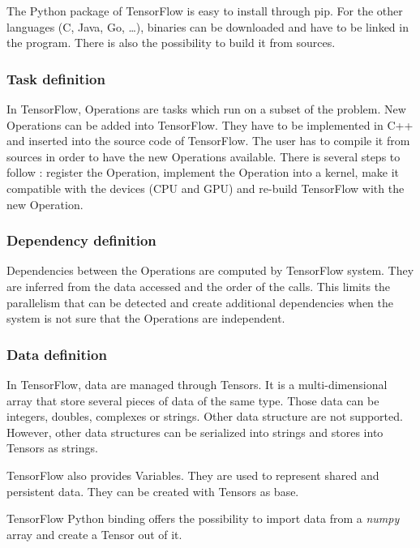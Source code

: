 The Python package of TensorFlow is easy to install through pip.
For the other languages (C, Java, Go, \dots), binaries can be downloaded and have to be linked in the program.
There is also the possibility to build it from sources.

\begin{figure}[h]

\end{figure}

\subsubsection{Task definition}
In TensorFlow, Operations are tasks which run on a subset of the problem.
New Operations can be added into TensorFlow.
They have to be implemented in C++ and inserted into the source code of TensorFlow.
The user has to compile it from sources in order to have the new Operations available.
There is several steps to follow : register the Operation, implement the Operation into a kernel, make it compatible with the devices (CPU and GPU) and re-build TensorFlow with the new Operation.


\subsubsection{Dependency definition}
Dependencies between the Operations are computed by TensorFlow system.
They are inferred from the data accessed and the order of the calls.
This limits the parallelism that can be detected and create additional dependencies when the system is not sure that the Operations are independent.

\subsubsection{Data definition}
In TensorFlow, data are managed through Tensors.
It is a multi-dimensional array that store several pieces of data of the same type.
Those data can be integers, doubles, complexes or strings.
Other data structure are not supported.
However, other data structures can be serialized into strings and stores into Tensors as strings.

TensorFlow also provides Variables.
They are used to represent shared and persistent data.
They can be created with Tensors as base.

TensorFlow Python binding offers the possibility to import data from a \textit{numpy} array and create a Tensor out of it.

